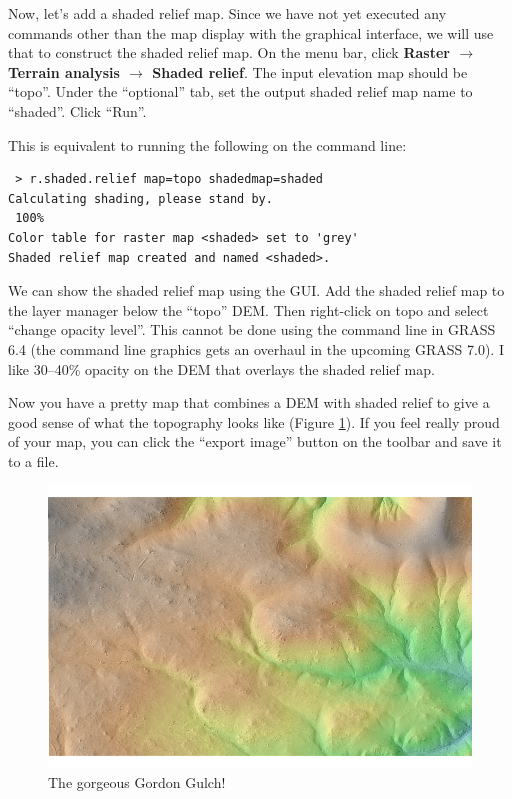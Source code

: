 \documentclass{book}
\begin{document}
Now, let's add a shaded relief map. Since we have not yet executed any commands other than the map display with the graphical interface, we will use that to construct the shaded relief map. On the menu bar, click {\bf Raster $\rightarrow$ Terrain analysis $\rightarrow$ Shaded relief}. The input elevation map should be ``topo''. Under the ``optional'' tab, set the output shaded relief map name to ``shaded''. Click ``Run''.

This is equivalent to running the following on the command line:
\begin{lstlisting}
 > r.shaded.relief map=topo shadedmap=shaded
Calculating shading, please stand by.
 100%
Color table for raster map <shaded> set to 'grey'
Shaded relief map created and named <shaded>.
\end{lstlisting}

We can show the shaded relief map using the GUI. Add the shaded relief map to the layer manager below the ``topo'' DEM. Then right-click on topo and select ``change opacity level''. This cannot be done using the command line in GRASS 6.4 (the command line graphics gets an overhaul in the upcoming GRASS 7.0). I like 30--40\% opacity on the DEM that overlays the shaded relief map.

Now you have a pretty map that combines a DEM with shaded relief to give a good sense of what the topography looks like (Figure \ref{fig:topo_relief_overlay}). If you feel really proud of your map, you can click the ``export image'' button on the toolbar and save it to a file.

\begin{figure}[h]
 \begin{center}
 \includegraphics[width=.9\linewidth]{figures/ubuntu/topo_relief_overlay.png}
 \caption{The gorgeous Gordon Gulch!}
 \label{fig:topo_relief_overlay}
 \end{center}
\end{figure}
\end{document}
